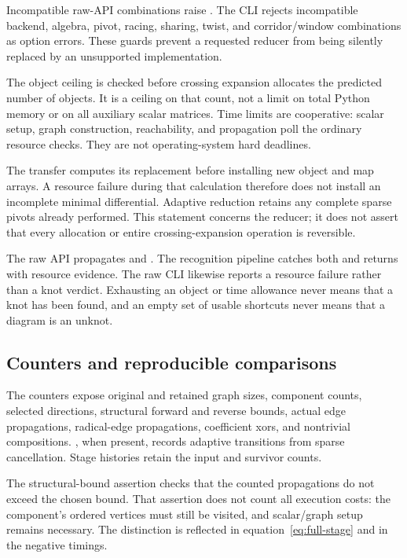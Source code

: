 Incompatible raw-API combinations raise . The CLI
rejects incompatible backend, algebra, pivot, racing, sharing, twist,
and corridor/window combinations as option errors. These guards
prevent a requested reducer from being silently replaced by an
unsupported implementation.

The object ceiling is checked before crossing expansion allocates
the predicted number of objects. It is a ceiling on that count,
not a limit on total Python memory or on all auxiliary scalar
matrices. Time limits are cooperative: scalar setup, graph
construction, reachability, and propagation poll the ordinary
resource checks. They are not operating-system hard deadlines.

The transfer computes its replacement before installing new object
and map arrays. A resource failure during that calculation therefore
does not install an incomplete minimal differential. Adaptive
reduction retains any complete sparse pivots already performed.
This statement concerns the reducer; it does not assert that every
allocation or entire crossing-expansion operation is reversible.

The raw  API propagates  and
. The recognition pipeline catches both and
returns  with resource evidence. The raw CLI likewise
reports a resource failure rather than a knot verdict. Exhausting
an object or time allowance never means that a knot has been found,
and an empty set of usable shortcuts never means that a diagram is
an unknot.

\subsection{Counters and reproducible comparisons}

The  counters expose original and retained graph
sizes, component counts, selected directions, structural forward
and reverse bounds, actual edge propagations, radical-edge
propagations, coefficient xors, and nontrivial compositions.
, when present, records adaptive transitions
from sparse cancellation. Stage histories retain the input and
survivor counts.

The structural-bound assertion checks that the counted
propagations do not exceed the chosen bound. That assertion does
not count all execution costs: the component's ordered vertices
must still be visited, and scalar/graph setup remains necessary.
The distinction is reflected in
equation~\eqref{eq:full-stage} and in the negative timings.


